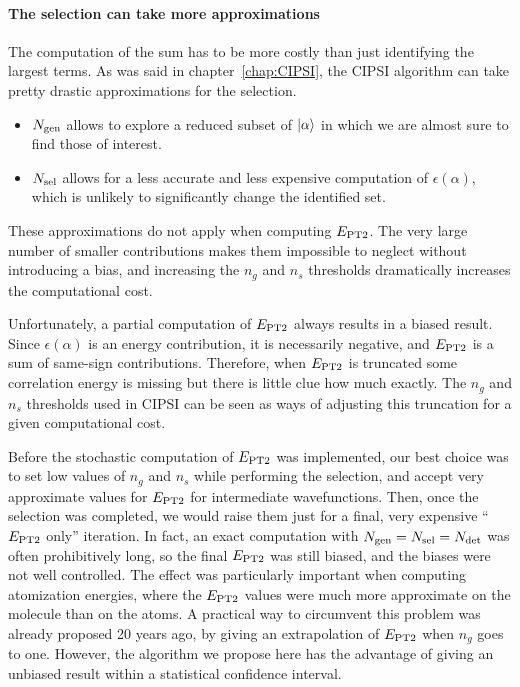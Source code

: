 \documentclass[./thesis.tex]{subfiles}
\begin{document}
\paragraph{The selection can take more approximations}
The computation of the sum has to be more costly than just identifying the largest terms. As was said in chapter~\ref{chap:CIPSI}, the CIPSI algorithm can take pretty drastic approximations for the selection.\cite{Evangelisti_1983}
	\begin{itemize}
		\item{${N_\text{gen}}$}
		allows to explore a reduced subset of $\ket \alpha$ in which we are almost sure to find those of interest.
		\item{${N_\text{sel}}$}
		allows for a less accurate and less expensive computation of $\epsilon(\alpha)$, which is unlikely to significantly change the identified set.
	\end{itemize}
	These approximations do not apply when computing $E_\text{PT2}$. The very large number of smaller contributions makes them impossible to neglect without introducing a bias, and increasing the $n_g$ and $n_s$ thresholds dramatically increases the computational cost.


Unfortunately, a partial computation of $E_\text{PT2}$ always results in a biased result. Since $\epsilon(\alpha)$ is an energy contribution, it is necessarily negative, and $E_\text{PT2}$ is a sum of same-sign contributions. Therefore, when $E_\text{PT2}$ is truncated some correlation energy is missing but there is little clue how much exactly. The $n_g$ and $n_s$ thresholds used in CIPSI can be seen as ways of adjusting this truncation for a given computational cost.

Before the stochastic computation of $E_\text{PT2}$ was implemented, our best choice was to set low values of $n_g$ and $n_s$ while performing the selection, and accept very approximate values for $E_\text{PT2}$ for intermediate wavefunctions. Then, once the selection was completed, we would raise them just for a final, very expensive ``$E_\text{PT2}$ only'' iteration. In fact, an exact computation with ${N_\text{gen}}={N_\text{sel}}={N_\text{det}}$ was often prohibitively long, so the final $E_\text{PT2}$ was still biased, and the biases were not well controlled. The effect was particularly important when computing atomization energies, where the $E_\text{PT2}$ values were much more approximate on the molecule than on the atoms.
A practical way to circumvent this problem was already proposed 20 years ago, by giving an extrapolation of $E_\text{PT2}$ when $n_g$ goes to one.\cite{Angeli_1997} However, the algorithm we propose here has the advantage of giving an unbiased result within a statistical confidence interval.
\end{document}

